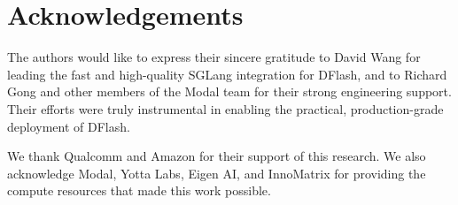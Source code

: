 \section*{Acknowledgements}

The authors would like to express their sincere gratitude to David Wang for leading the fast and high-quality SGLang integration for DFlash, and to Richard Gong and other members of the Modal team for their strong engineering support. Their efforts were truly instrumental in enabling the practical, production-grade deployment of DFlash. 

We thank Qualcomm and Amazon for their support of this research. We also acknowledge Modal, Yotta Labs, Eigen AI, and InnoMatrix for providing the compute resources that made this work possible.
